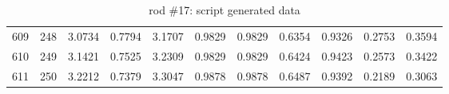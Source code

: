 \begin{table}[p]
{\begin{minipage}{\textheight}
\begin{tabular}{rr|lll|ll|llll}
609   	& 248 			& 3.0734	& 0.7794 	& 3.1707			& 0.9829	& 0.9829	& 0.6354	& 0.9326		& 0.2753			& 0.3594				\\
610   	& 249 			& 3.1421	& 0.7525 	& 3.2309			& 0.9829	& 0.9829	& 0.6424	& 0.9423		& 0.2573			& 0.3422				\\
611   	& 250 			& 3.2212	& 0.7379 	& 3.3047			& 0.9878	& 0.9878	& 0.6487	& 0.9392		& 0.2189			& 0.3063				
\end{tabular}
       \caption{rod \#17: script generated data}
       \label{tab:spit-out-17}
     \end{minipage}
   }
 \end{table}



